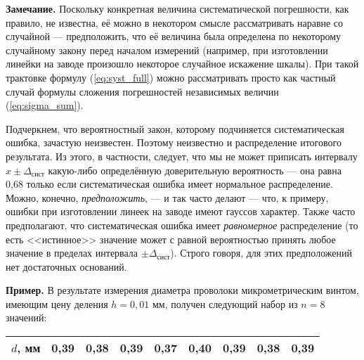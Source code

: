 \documentclass[10pt]{article}
\begin{document}
\textbf{\footnotesize{}Замечание.}{\footnotesize{} Поскольку конкретная
величина систематической погрешности, как правило, не известна, её
можно в некотором смысле рассматривать наравне со случайной ---
предположить, что её величина была определена по некоторому случайному
закону перед началом измерений (например, при изготовлении линейки
на заводе произошло некоторое случайное искажение шкалы). При такой
трактовке формулу (\ref{eq:syst_full}) можно рассматривать просто
как частный случай формулы сложения погрешностей независимых величин
(\ref{eq:sigma_sum}).}{\footnotesize\par}

{\footnotesize{}Подчеркнем, что вероятностный закон, которому подчиняется
систематическая ошибка, зачастую неизвестен. Поэтому неизвестно и
распределение итогового результата. Из этого, в частности, следует,
что мы не может приписать интервалу $x\pm\Delta_{\text{сист}}$ какую-либо
определённую доверительную вероятность --- она равна 0,68
только если систематическая ошибка имеет нормальное распределение.
Можно, конечно, }\emph{\footnotesize{}предположить}{\footnotesize{},
--- и так часто делают --- что, к примеру, ошибки
при изготовлении линеек на заводе имеют гауссов характер. Также часто
предполагают, что систематическая ошибка имеет }\emph{\footnotesize{}равномерное}{\footnotesize{}
распределение (то есть <<истинное>> значение
может с равной вероятностью принять любое значение в пределах интервала
$\pm\Delta_{\text{сист}}$). Строго говоря, для этих предположений
нет достаточных оснований.}{\footnotesize\par}

\textbf{\footnotesize{}Пример.}{\footnotesize{} В результате измерения
диаметра проволоки микрометрическим винтом, имеющим цену деления $h=0,01$
мм, получен следующий набор из $n=8$ значений:}{\footnotesize\par}

{\footnotesize{}}%
\begin{tabular}{|c|c|c|c|c|c|c|c|c|}
\hline 
{\footnotesize{}$d$, мм} & {\footnotesize{}0,39} & {\footnotesize{}0,38} & {\footnotesize{}0,39} & {\footnotesize{}0,37} & {\footnotesize{}0,40} & {\footnotesize{}0,39} & {\footnotesize{}0,38} & {\footnotesize{}0,39}\tabularnewline
\hline 
\end{tabular}{\footnotesize{} }{\footnotesize\par}
\end{document}
